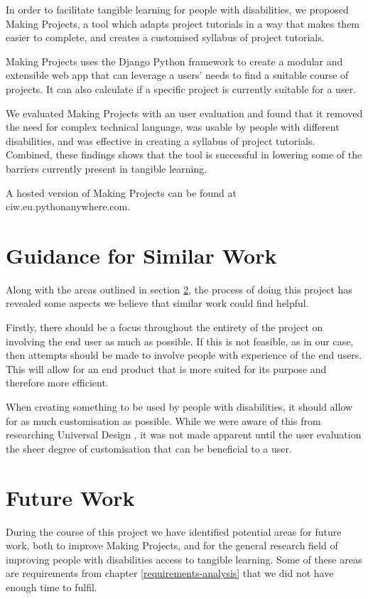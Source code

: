 \documentclass{l4proj}
\begin{document}
In order to facilitate tangible learning for people with disabilities, we proposed Making Projects, a tool which adapts project tutorials in a way that makes them easier to complete, and creates a customised syllabus of project tutorials. 

Making Projects uses the Django Python framework to create a modular and extensible web app that can leverage a users' needs to find a suitable course of projects. It can also calculate if a specific project is currently suitable for a user. 

We evaluated Making Projects with an user evaluation and found that it removed the need for complex technical language, was usable by people with different disabilities, and was effective in creating a syllabus of project tutorials. Combined, these findings shows that the tool is successful in lowering some of the barriers currently present in tangible learning. 

A hosted version of Making Projects can be found at ciw.eu.pythonanywhere.com. 


\section{Guidance for Similar Work}
Along with the areas outlined in section \ref{future-work}, the process of doing this project has revealed some aspects we believe that similar work could find helpful. 

Firstly, there should be a focus throughout the entirety of the project on involving the end user as much as possible. If this is not feasible, as in our case, then attempts should be made to involve people with experience of the end users. This will allow for an end product that is more suited for its purpose and therefore more efficient. 

When creating something to be used by people with disabilities, it should allow for as much customisation as possible. While we were aware of this from researching Universal Design \citep{Cen1997}, it was not made apparent until the user evaluation the sheer degree of customisation that can be beneficial to a user. 


\section{Future Work}
\label{future-work}
During the course of this project we have identified potential areas for future work, both to improve Making Projects, and for the general research field of improving people with disabilities access to tangible learning. Some of these areas are requirements from chapter \ref{requirements-analysis} that we did not have enough time to fulfil. 
\end{document}

